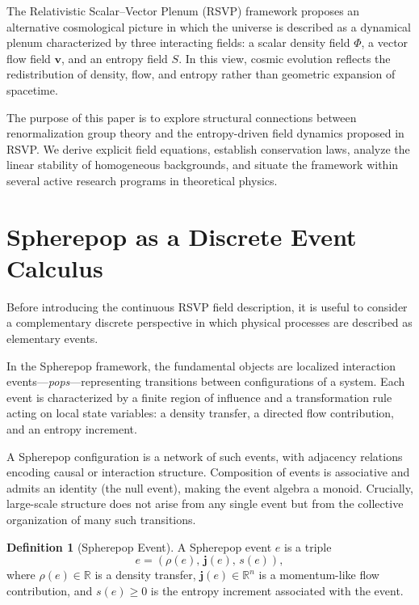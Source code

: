 \documentclass[12pt,a4paper]{article}
\theoremstyle{plain}
\theoremstyle{definition}
\newtheorem{definition}{Definition}
\theoremstyle{remark}
\begin{document}
The Relativistic Scalar--Vector Plenum (RSVP) framework proposes an
alternative cosmological picture in which the universe is described as
a dynamical plenum characterized by three interacting fields: a scalar
density field $\Phi$, a vector flow field $\mathbf{v}$, and an entropy
field $S$. In this view, cosmic evolution reflects the redistribution
of density, flow, and entropy rather than geometric expansion of
spacetime.

The purpose of this paper is to explore structural connections between
renormalization group theory and the entropy-driven field dynamics
proposed in RSVP. We derive explicit field equations, establish
conservation laws, analyze the linear stability of homogeneous
backgrounds, and situate the framework within several active research
programs in theoretical physics.

\section{Spherepop as a Discrete Event Calculus}
\label{sec:spherepop}

Before introducing the continuous RSVP field description, it is useful
to consider a complementary discrete perspective in which physical
processes are described as elementary events.

In the Spherepop framework, the fundamental objects are localized
interaction events---\emph{pops}---representing transitions between
configurations of a system. Each event is characterized by a finite
region of influence and a transformation rule acting on local state
variables: a density transfer, a directed flow contribution, and an
entropy increment.

A Spherepop configuration is a network of such events, with adjacency
relations encoding causal or interaction structure. Composition of
events is associative and admits an identity (the null event), making
the event algebra a monoid. Crucially, large-scale structure does not
arise from any single event but from the collective organization of
many such transitions.

\begin{definition}[Spherepop Event]
A Spherepop event $e$ is a triple
\begin{equation}
e = (\rho(e),\, \mathbf{j}(e),\, s(e)),
\end{equation}
where $\rho(e) \in \mathbb{R}$ is a density transfer, $\mathbf{j}(e)
\in \mathbb{R}^n$ is a momentum-like flow contribution, and $s(e) \geq
0$ is the entropy increment associated with the event.
\end{definition}
\end{document}
